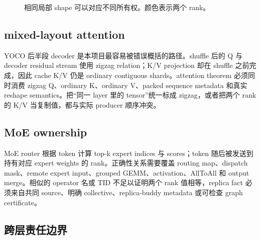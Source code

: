 \documentclass[10.5pt,a4paper]{ctexart}
\begin{document}
\begin{figure}[h]
\centering
{}
\caption{相同局部 shape 可以对应不同所有权。颜色表示两个 rank。}
\label{fig:layout}
\end{figure}

\subsection{mixed-layout attention}

YOCO 后半段 decoder 是本项目最容易被错误概括的路径。shuffle 后的 Q 与 decoder residual stream 使用 zigzag relation；K/V projection 却在 shuffle 之前完成，因此 cache K/V 仍是 ordinary contiguous shards。attention theorem 必须同时消费 zigzag Q、ordinary K、ordinary V、packed sequence metadata 和真实 reshape semantics。把“同一 layer 里的 tensor”统一标成 zigzag，或者把两个 rank 的 K/V 当复制值，都与实际 producer 顺序冲突。

\subsection{MoE ownership}

MoE router 根据 token 计算 top-k expert indices 与 scores；token 随后被发送到持有对应 expert weights 的 rank。正确性关系需要覆盖 routing map、dispatch mask、remote expert input、grouped GEMM、activation、AllToAll 和 output merge。相似的 operator 名或 TID 不足以证明两个 rank 值相等，replica fact 必须来自共同 source、明确 collective、replica-buddy metadata 或可检查 graph certificate。

\subsection{跨层责任边界}
\end{document}
